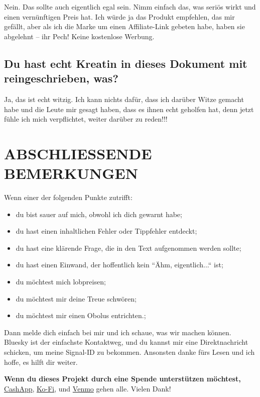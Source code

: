 \documentclass{article}
\begin{document}
Nein. Das sollte auch eigentlich egal sein. Nimm einfach das, was seriös wirkt und einen vernünftigen Preis hat. Ich würde ja das Produkt empfehlen, das mir gefällt, aber als ich die Marke um einen Affiliate-Link gebeten habe, haben sie abgelehnt – ihr Pech! Keine kostenlose Werbung.

\subsection{Du hast echt Kreatin in dieses Dokument mit reingeschrieben, was?}

Ja, das ist echt witzig. Ich kann nichts dafür, dass ich darüber Witze gemacht habe und die Leute mir gesagt haben, dass es ihnen echt geholfen hat, denn jetzt fühle ich mich verpflichtet, weiter darüber zu reden!!!

\section{ABSCHLIESSENDE BEMERKUNGEN}

Wenn einer der folgenden Punkte zutrifft:

\begin{itemize}
\item du bist sauer auf mich, obwohl ich dich gewarnt habe;

\item du hast einen inhaltlichen Fehler oder Tippfehler entdeckt;

\item du hast eine klärende Frage, die in den Text aufgenommen werden sollte;

\item du hast einen Einwand, der hoffentlich kein “Ähm, eigentlich...“ ist;

\item du möchtest mich lobpreisen;

\item du möchtest mir deine Treue schwören; 

\item du möchtest mir einen Obolus entrichten.;
\end{itemize}

Dann melde dich einfach bei mir und ich schaue, was wir machen können. Bluesky ist der einfachste Kontaktweg, und du kannst mir eine Direktnachricht schicken, um meine Signal-ID zu bekommen. Ansonsten danke fürs Lesen und ich hoffe, es hilft dir weiter.

\textbf{Wenn du dieses Projekt durch eine Spende unterstützen möchtest,} \href{https://cash.app/Katitties}{CashApp}, \href{https://ko-fi.com/katitties}{Ko-Fi}, und \href{https://account.venmo.com/u/katitties}{Venmo} gehen alle. Vielen Dank!
\end{document}
